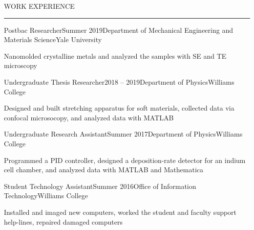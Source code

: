 \documentclass{short_resume} %
\renewenvironment{rSection}[1]{
	\sectionskip
	\textcolor{RoyalPurple}{\MakeUppercase{#1}}
	\sectionlineskip
	\hrule
	\begin{list}{}{
			\setlength{\leftmargin}{1.5em}
		}
		\item[]
	}{
	\end{list}
}
\begin{document}
	\begin{rSection}{Work Experience}
		\begin{rSubsection}{Postbac Researcher}{Summer 2019}{Department of Mechanical Engineering and Materials Science}{Yale University}
			\item[] Nanomolded crystalline metals and analyzed the samples with SE and TE microscopy
		\end{rSubsection}
		
		\begin{rSubsection}{Undergraduate Thesis Researcher}{2018 -- 2019}{Department of Physics}{Williams College}
			\item[] Designed and built stretching apparatus for soft materials, collected data via confocal microsocopy, and analyzed data with MATLAB
		\end{rSubsection}
		
		\begin{rSubsection}{Undergraduate Research Assistant}{Summer 2017}{Department of Physics}{Williams College}
			\item[] Programmed a PID controller, designed a deposition-rate detector for an indium cell chamber, and analyzed data with MATLAB and Mathematica
		\end{rSubsection}
	
		\begin{rSubsection}{Student Technology Assistant}{Summer 2016}{Office of Information Technology}{Williams College}
		\item[] Installed and imaged new computers, worked the student and faculty support help-lines, repaired damaged computers
		\end{rSubsection}
	
	\end{rSection}
	
\end{document}
